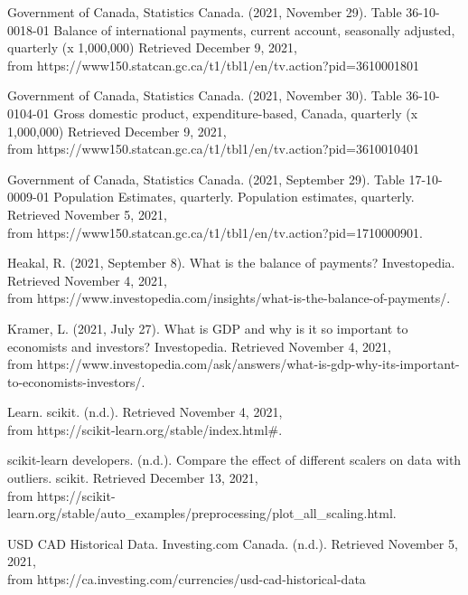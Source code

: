 \documentclass{article}
\begin{document}
Government of Canada, Statistics Canada. (2021, November 29). Table 36-10-0018-01  Balance of international payments, current account, seasonally adjusted, quarterly (x 1,000,000) Retrieved December 9, 2021,\\ from https://www150.statcan.gc.ca/t1/tbl1/en/tv.action?pid=3610001801

Government of Canada, Statistics Canada. (2021, November 30). Table 36-10-0104-01  	Gross domestic product, expenditure-based, Canada, quarterly (x 1,000,000) Retrieved December 9, 2021,\\ from https://www150.statcan.gc.ca/t1/tbl1/en/tv.action?pid=3610010401

Government of Canada, Statistics Canada. (2021, September 29). Table 17-10-0009-01 Population Estimates, quarterly. Population estimates, quarterly. Retrieved November 5, 2021,\\ from https://www150.statcan.gc.ca/t1/tbl1/en/tv.action?pid=1710000901.

Heakal, R. (2021, September 8). What is the balance of payments? Investopedia. Retrieved November 4, 2021,\\ from https://www.investopedia.com/insights/what-is-the-balance-of-payments/. 

Kramer, L. (2021, July 27). What is GDP and why is it so important to economists and investors? Investopedia. Retrieved November 4, 2021,\\ from https://www.investopedia.com/ask/answers/what-is-gdp-why-its-important-to-economists-investors/. 

Learn. scikit. (n.d.). Retrieved November 4, 2021,\\ from https://scikit-learn.org/stable/index.html#. 

scikit-learn developers. (n.d.). Compare the effect of different scalers on data with outliers. scikit. Retrieved December 13, 2021,\\ from https://scikit-learn.org/stable/auto\_examples/preprocessing/plot\_all\_scaling.html. 

USD CAD Historical Data. Investing.com Canada. (n.d.). Retrieved November 5, 2021,\\ from https://ca.investing.com/currencies/usd-cad-historical-data
\end{document}
